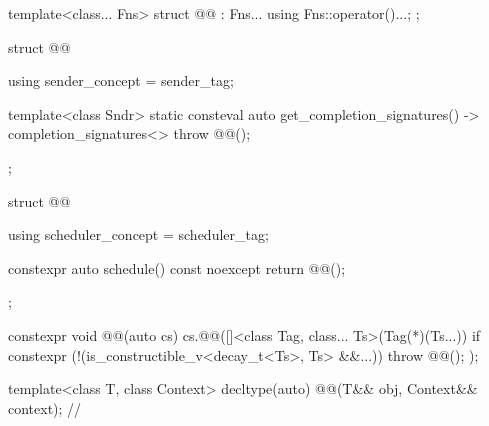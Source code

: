 \pnum
{}
\begin{codeblock}
template<class... Fns>
struct @@ : Fns... {
  using Fns::operator()...;
};
\end{codeblock}

\pnum
{}
\begin{codeblock}
struct @@ {
  using sender_concept = sender_tag;

  template<class Sndr>
    static consteval auto get_completion_signatures() -> completion_signatures<> {
      throw @@();
  }
};
\end{codeblock}

\pnum
{}%
%
\begin{codeblock}
struct @@ {
  using scheduler_concept = scheduler_tag;

  constexpr auto schedule() const noexcept {
    return @@();
  }
};
\end{codeblock}

\pnum
{}
\begin{codeblock}
constexpr void @@(auto cs) {
  cs.@@([]<class Tag, class... Ts>(Tag(*)(Ts...)) {
    if constexpr (!(is_constructible_v<decay_t<Ts>, Ts> &&...))
      throw @@();
  });
}
\end{codeblock}

\begin{itemdecl}
template<class T, class Context>
  decltype(auto) @@(T&& obj, Context&& context);       // \expos
\end{itemdecl}

